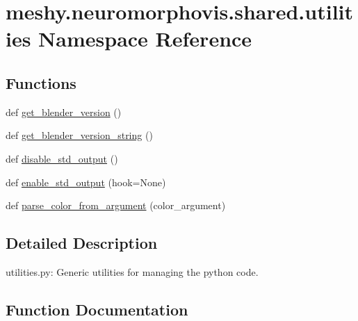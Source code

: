 \hypertarget{namespacemeshy_1_1neuromorphovis_1_1shared_1_1utilities}{}\section{meshy.\+neuromorphovis.\+shared.\+utilities Namespace Reference}
\label{namespacemeshy_1_1neuromorphovis_1_1shared_1_1utilities}
\subsection*{Functions}
\begin{DoxyCompactItemize}
\item 
def \hyperlink{namespacemeshy_1_1neuromorphovis_1_1shared_1_1utilities_aa1f007af9bdc6d462ce6163378dc51db}{get\+\_\+blender\+\_\+version} ()
\item 
def \hyperlink{namespacemeshy_1_1neuromorphovis_1_1shared_1_1utilities_a828e662fe8e88d32111ae641063dac4b}{get\+\_\+blender\+\_\+version\+\_\+string} ()
\item 
def \hyperlink{namespacemeshy_1_1neuromorphovis_1_1shared_1_1utilities_a975d3a356a2d005d540812bd39a6030c}{disable\+\_\+std\+\_\+output} ()
\item 
def \hyperlink{namespacemeshy_1_1neuromorphovis_1_1shared_1_1utilities_ae9711f2717f32ca99e16880f1443412e}{enable\+\_\+std\+\_\+output} (hook=None)
\item 
def \hyperlink{namespacemeshy_1_1neuromorphovis_1_1shared_1_1utilities_a09c3ebb0f05df40596d53ceaa2504492}{parse\+\_\+color\+\_\+from\+\_\+argument} (color\+\_\+argument)
\end{DoxyCompactItemize}


\subsection{Detailed Description}
\begin{DoxyVerb}utilities.py:
    Generic utilities for managing the python code.
\end{DoxyVerb}
 

\subsection{Function Documentation}
